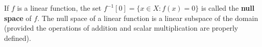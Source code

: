 If $f$ is a linear function, the set $f^{-1}[0] = \{x \in X : f(x) = 0\}$ is called the \textbf{null space} of $f$. The null space of a linear function is a linear subspace of the domain (provided the operations of addition and scalar multiplication are properly defined).

